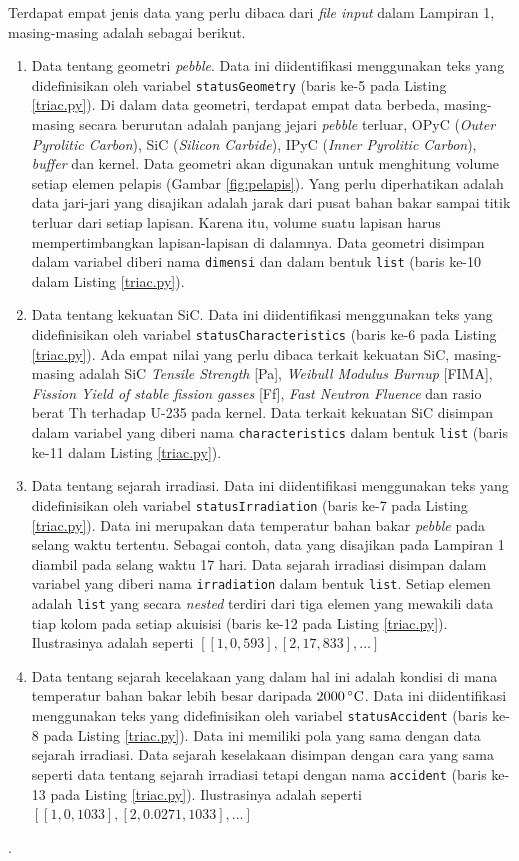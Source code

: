 \documentclass[a4paper,11pt]{report}
\begin{document}
Terdapat empat jenis data yang perlu dibaca dari \textit{file input} dalam Lampiran 1, masing-masing adalah sebagai berikut.
\begin{enumerate}
  \item Data tentang geometri \textit{pebble}. Data ini diidentifikasi menggunakan teks yang didefinisikan oleh variabel \texttt{statusGeometry} (baris ke-5 pada Listing \ref{triac.py}). Di dalam data geometri, terdapat empat data berbeda, masing-masing secara berurutan adalah panjang jejari \textit{pebble} terluar, OPyC (\textit{Outer Pyrolitic Carbon}), SiC (\textit{Silicon Carbide}), IPyC (\textit{Inner Pyrolitic Carbon}), \textit{buffer} dan kernel. Data geometri akan digunakan untuk menghitung volume setiap elemen pelapis (Gambar \ref{fig:pelapis}). Yang perlu diperhatikan adalah data jari-jari yang disajikan adalah jarak dari pusat bahan bakar sampai titik terluar dari setiap lapisan. Karena itu, volume suatu lapisan harus mempertimbangkan lapisan-lapisan di dalamnya. Data geometri disimpan dalam variabel diberi nama \texttt{dimensi} dan dalam bentuk \texttt{list} (baris ke-10 dalam Listing \ref{triac.py}).
  \item Data tentang kekuatan SiC. Data ini diidentifikasi menggunakan teks yang didefinisikan oleh variabel \texttt{statusCharacteristics} (baris ke-6 pada Listing \ref{triac.py}). Ada empat nilai yang perlu dibaca terkait kekuatan SiC, masing-masing adalah SiC \textit{Tensile Strength} [Pa],	\textit{Weibull Modulus	Burnup} [FIMA],	\textit{Fission Yield of stable fission gasses} [Ff],	\textit{Fast Neutron Fluence}	dan rasio berat Th terhadap U-235 pada kernel. Data terkait kekuatan SiC disimpan dalam variabel yang diberi nama \texttt{characteristics} dalam bentuk \texttt{list} (baris ke-11 dalam Listing \ref{triac.py}).
    \item Data tentang sejarah irradiasi. Data ini diidentifikasi menggunakan teks yang didefinisikan oleh variabel \texttt{statusIrradiation} (baris ke-7 pada Listing \ref{triac.py}). Data ini merupakan data temperatur bahan bakar \textit{pebble} pada selang waktu tertentu. Sebagai contoh, data yang disajikan pada Lampiran 1 diambil pada selang waktu 17 hari. Data sejarah irradiasi disimpan dalam variabel yang diberi nama \texttt{irradiation} dalam bentuk \texttt{list}. Setiap elemen adalah \texttt{list} yang secara \textit{nested} terdiri dari tiga elemen yang mewakili data tiap kolom pada setiap akuisisi (baris ke-12 pada Listing \ref{triac.py}). Ilustrasinya adalah seperti $[[1,	0,	593], [2,	17,	833], \ldots]$
    \item Data tentang sejarah kecelakaan yang dalam hal ini adalah kondisi di mana temperatur bahan bakar lebih besar daripada $2000\,^{\circ}{\rm C}$. Data ini diidentifikasi menggunakan teks yang didefinisikan oleh variabel \texttt{statusAccident} (baris ke-8 pada Listing \ref{triac.py}). Data ini memiliki pola yang sama dengan data sejarah irradiasi. Data sejarah keselakaan disimpan dengan cara yang sama seperti data tentang sejarah irradiasi tetapi dengan nama \texttt{accident} (baris ke-13 pada Listing \ref{triac.py}). Ilustrasinya adalah seperti $[[1,	0,	1033], [2,	0.0271,	1033],\ldots]$
\end{enumerate}.
 
\end{document}
